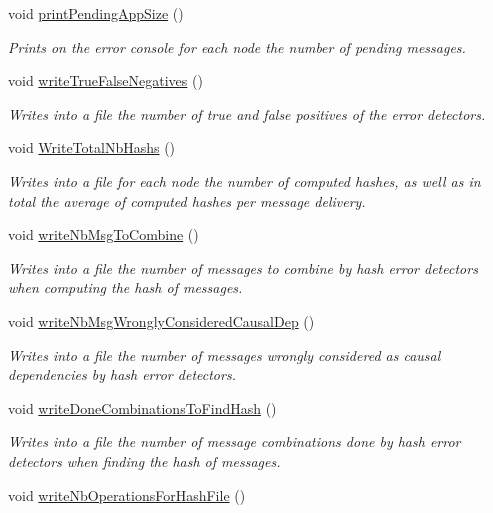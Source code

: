 \begin{DoxyCompactItemize}
void \hyperlink{class_stats_a5b65312e84788b3fe5e19c8e535a03f4}{print\+Pending\+App\+Size} ()
\begin{DoxyCompactList}\small\item\em Prints on the error console for each node the number of pending messages. \end{DoxyCompactList}\item 
void \hyperlink{class_stats_aa76e3bfd22087fad066c5a628a269d06}{write\+True\+False\+Negatives} ()
\begin{DoxyCompactList}\small\item\em Writes into a file the number of true and false positives of the error detectors. \end{DoxyCompactList}\item 
void \hyperlink{class_stats_a89cedfe36937b0f9a5f525a8858e54f2}{Write\+Total\+Nb\+Hashs} ()
\begin{DoxyCompactList}\small\item\em Writes into a file for each node the number of computed hashes, as well as in total the average of computed hashes per message delivery. \end{DoxyCompactList}\item 
void \hyperlink{class_stats_ae91ab66504445b9e703966b505a55eaa}{write\+Nb\+Msg\+To\+Combine} ()
\begin{DoxyCompactList}\small\item\em Writes into a file the number of messages to combine by hash error detectors when computing the hash of messages. \end{DoxyCompactList}\item 
void \hyperlink{class_stats_a04ae8a18f5e0713f9275a3cf7b20d181}{write\+Nb\+Msg\+Wrongly\+Considered\+Causal\+Dep} ()
\begin{DoxyCompactList}\small\item\em Writes into a file the number of messages wrongly considered as causal dependencies by hash error detectors. \end{DoxyCompactList}\item 
void \hyperlink{class_stats_a73a83aa6b190ceb71e8ed2b131338d81}{write\+Done\+Combinations\+To\+Find\+Hash} ()
\begin{DoxyCompactList}\small\item\em Writes into a file the number of message combinations done by hash error detectors when finding the hash of messages. \end{DoxyCompactList}\item 
void \hyperlink{class_stats_af07c3564deda3a19d1efe92108a20c19}{write\+Nb\+Operations\+For\+Hash\+File} ()

\end{DoxyCompactItemize}
